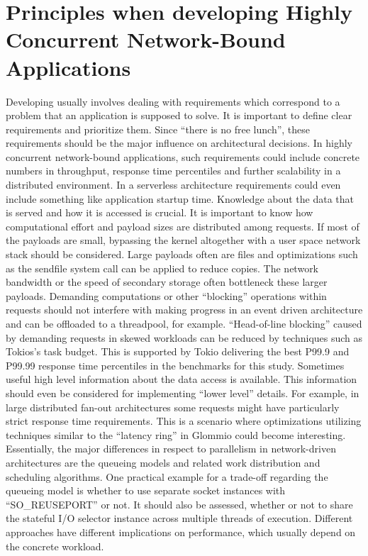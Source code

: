 \section{Principles when developing Highly Concurrent Network-Bound Applications}
Developing usually involves dealing with requirements which correspond to a problem that an application is supposed to solve. It is important to define clear requirements and prioritize them. Since “there is no free lunch”, these requirements should be the major influence on architectural decisions. In highly concurrent network-bound applications, such requirements could include concrete numbers in throughput, response time percentiles and further scalability in a distributed environment. In a serverless architecture requirements could even include something like application startup time.  \newline
Knowledge about the data that is served and how it is accessed is crucial. It is important to know how computational effort and payload sizes are distributed among requests.
If most of the payloads are small, bypassing the kernel altogether with a user space network stack should be considered. Large payloads often are files and optimizations such as the sendfile system call can be applied to reduce copies. The network bandwidth or the speed of secondary storage often bottleneck these larger payloads.
Demanding computations or other “blocking” operations within requests should not interfere with making progress in an event driven architecture and can be offloaded to a threadpool,  for example. “Head-of-line blocking” caused by demanding requests in skewed workloads can be reduced by techniques such as Tokios’s task budget. This is supported by Tokio delivering the best P99.9 and P99.99 response time percentiles in the benchmarks for this study.  \newline
Sometimes useful high level information about the data access is available. This information should even be considered for implementing “lower level” details. For example, in large distributed fan-out architectures some requests might have particularly strict response time requirements. This is a scenario where optimizations utilizing techniques similar to the “latency ring” in Glommio could become interesting.  \newline
Essentially, the major differences in respect to parallelism in network-driven architectures are the queueing models and related work distribution and scheduling algorithms. 
One practical example for a trade-off regarding the queueing model is whether to use separate socket instances with “SO\_REUSEPORT” or not. It should also be assessed, whether or not to share the stateful I/O selector instance across multiple threads of execution. Different approaches have different implications on performance, which usually depend on the concrete workload. \newline
